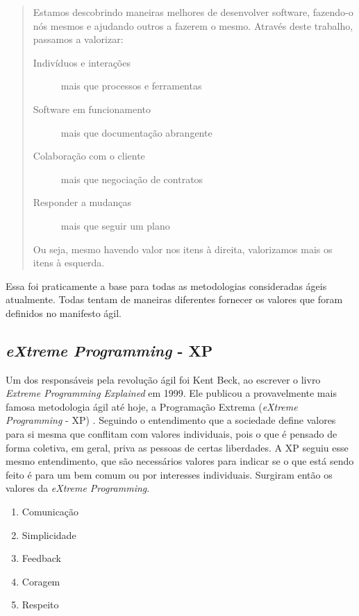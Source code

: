 \documentclass[
	article,			%
	11pt,				%
	oneside,			%
	a4paper,			%
	english,			%
	brazil,				%
	sumario=tradicional
	]{abntex2}
\begin{document}
\begin{quotation}
   Estamos descobrindo maneiras melhores de desenvolver software, fazendo-o nós
   mesmos e ajudando outros a fazerem o mesmo. Através deste trabalho, passamos
   a valorizar:
   
   \begin{description}
      \item[Indivíduos e interações] mais que processos e ferramentas
      \item[Software em funcionamento] mais que documentação abrangente
      \item[Colaboração com o cliente] mais que negociação de contratos
      \item[Responder a mudanças] mais que seguir um plano
   \end{description}
   
   Ou seja, mesmo havendo valor nos itens à direita, valorizamos mais os itens
   à esquerda.
\end{quotation}

Essa foi praticamente a base para todas as metodologias consideradas ágeis
atualmente. Todas tentam de maneiras diferentes fornecer os valores que foram
definidos no manifesto ágil.

\subsection{\textit{eXtreme Programming} - XP}

Um dos responsáveis pela revolução ágil foi Kent Beck, ao escrever o livro
\textit{Extreme Programming Explained} em 1999. Ele publicou a provavelmente
mais famosa metodologia ágil até hoje, a Programação Extrema (\textit{eXtreme
Programming} - XP) \cite{Beck:1999:ECE:619045.621348}. Seguindo o entendimento
que a sociedade define valores para si mesma que conflitam com valores
individuais, pois o que é pensado de forma coletiva, em geral, priva as pessoas
de certas liberdades. A XP seguiu esse mesmo entendimento, que são necessários
valores para indicar se o que está sendo feito é para um bem comum ou por
interesses individuais. Surgiram então os valores da \textit{eXtreme
Programming}.


\begin{enumerate}
   \item Comunicação
   \item Simplicidade
   \item Feedback
   \item Coragem
   \item Respeito
\end{enumerate}
\end{document}
